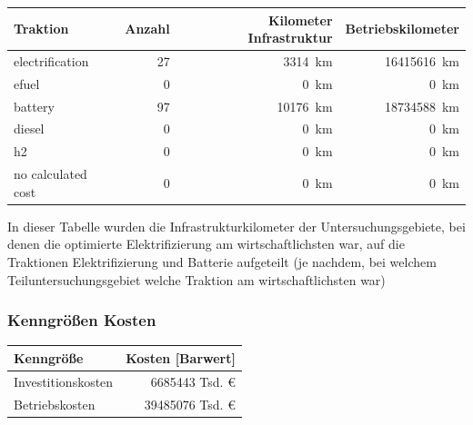 \begin{center}
	\begin{tabularx}{\textwidth}{X | r | r | r} Traktion & Anzahl & Kilometer Infrastruktur & Betriebskilometer \\
	\hline
            electrification & \num{27} &  \SI{3314}{\km} & \SI{16415616}{\km}\\
            efuel & \num{0} &  \SI{0}{\km} & \SI{0}{\km}\\
            battery & \num{97} &  \SI{10176}{\km} & \SI{18734588}{\km}\\
            diesel & \num{0} &  \SI{0}{\km} & \SI{0}{\km}\\
            h2 & \num{0} &  \SI{0}{\km} & \SI{0}{\km}\\
            no calculated cost & \num{0} &  \SI{0}{\km} & \SI{0}{\km}\\
    	\end{tabularx}
\end{center}
In dieser Tabelle wurden die Infrastrukturkilometer der Untersuchungsgebiete, bei denen die optimierte Elektrifizierung am wirtschaftlichsten war, auf die Traktionen Elektrifizierung und Batterie aufgeteilt (je nachdem, bei welchem Teiluntersuchungsgebiet welche Traktion am wirtschaftlichsten war)

\subsubsection{Kenngrößen Kosten}

\begin{center}
	\begin{tabularx}{\textwidth}{X | r } Kenngröße & Kosten [Barwert] \\
	\hline
	Investitionskosten & \num{6685443} Tsd. €\\
	Betriebskosten & \num{39485076} Tsd. €
	\end{tabularx}
\end{center}


